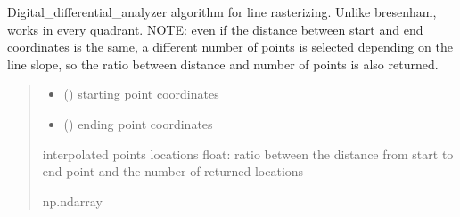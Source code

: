 \documentclass[letterpaper,10pt,english]{sphinxmanual}
\begin{document}
\begin{fulllineitems}
\label{\detokenize{micropolarray.processing:micropolarray.processing.linear_roi.DDA}}
\pysigstartsignatures
{}
\pysigstopsignatures
\sphinxAtStartPar
Digital\_differential\_analyzer algorithm for line rasterizing.
Unlike bresenham, works in every quadrant.
NOTE: even if the distance between start and end coordinates is
the same, a different number of points is selected depending on
the line slope, so the ratio between distance and number of
points is also returned.
\begin{quote}\begin{description}
\begin{itemize}
\item {} 
\sphinxAtStartPar
{} () \textendash{} starting point coordinates

\item {} 
\sphinxAtStartPar
{} () \textendash{} ending point coordinates

\end{itemize}

\sphinxAtStartPar
interpolated points locations
float: ratio between the distance from start to end point and
the number of returned locations

\sphinxAtStartPar
np.ndarray

\end{description}\end{quote}

\end{fulllineitems}

\end{document}
